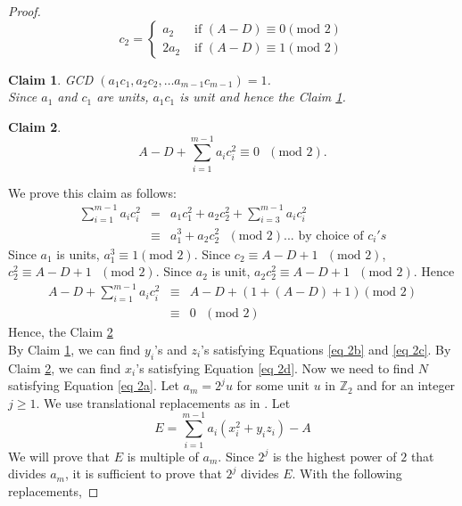 \documentclass[12pt,a4paper]{article}
\newtheorem{claim}{Claim}[section]
\begin{document}
\begin{proof}
		\begin{equation*}
			c_2 = \begin{cases}
				a_2 &\mbox{ if } (A-D) \equiv 0 ( \mbox{mod } 2)\\
				2a_2 &\mbox{ if } (A-D) \equiv 1 ( \mbox{mod } 2)
			\end{cases}
		\end{equation*}	
		\begin{claim}\label{clm gcd aici =1}
			GCD $(a_1c_1, a_2c_2, \ldots a_{m-1}c_{m-1}) = 1$.\\ Since $a_1$ and $c_1$ are units, $a_1c_1$ is unit and hence the Claim \ref{clm gcd aici =1}.
		\end{claim}
		\begin{claim}\label{clm 2aicizi for p=2}
			\begin{equation*}
				A-D + \sum_{i=1}^{m-1} a_ic_i^2 \equiv 0 \mbox{ } (\mbox{mod }2).
			\end{equation*}
		\end{claim}
		We prove this claim as follows:
		\begin{eqnarray*}
			\sum_{i=1}^{m-1} a_ic_i^2 &=& a_1c_1^2+a_2c_2^2 + \sum_{i=3}^{m-1} a_ic_i^2 \\
			&\equiv & a_1^3+a_2c_2^2 \mbox{ } (\mbox{mod } 2) \mbox{... by choice of } c_i's
		\end{eqnarray*}
		Since $a_1$ is units, $a_1^3 \equiv 1 (\mbox{mod }2)$. Since $c_2 \equiv A-D+1 \mbox{ } (\mbox{mod } 2)$, $c_2^2 \equiv A-D+1 \mbox{ } (\mbox{mod } 2)$. Since $a_2$ is unit, $a_2c_2^2 \equiv A-D+1 \mbox{ } (\mbox{mod } 2)$. Hence
		\begin{eqnarray*}
			A-D + \sum_{i=1}^{m-1}a_ic_i^2 &\equiv& A-D + (1+(A-D)+1) (\mbox{mod }2)\\
			&\equiv & 0 \mbox{ }(\mbox{mod }2)
		\end{eqnarray*}
		Hence, the Claim \ref{clm 2aicizi for p=2}\\
		By Claim \ref{clm gcd aici =1}, we can find $y_i$'s and $z_i$'s satisfying Equations \eqref{eq 2b} and \eqref{eq 2c}. By Claim \ref{clm 2aicizi for p=2}, we can find $x_i$'s satisfying Equation \eqref{eq 2d}. Now we need to find $N$ satisfying Equation \eqref{eq 2a}. Let $a_m=2^j u$ for some unit $u$ in $\mathbb{Z}_2$ and for an integer $j \geq 1$. We use translational replacements as in \cite{JunginLee}. Let
		\begin{equation*}
			E= \sum_{i=1}^{m-1} a_i (x_i^2 + y_iz_i) - A
		\end{equation*}
		We will prove that $E$ is multiple of $a_m$. Since $2^j$ is the highest power of $2$ that divides $a_m$, it is sufficient to prove that $2^j$ divides $E$. With the following replacements,

\end{proof}
\end{document}

